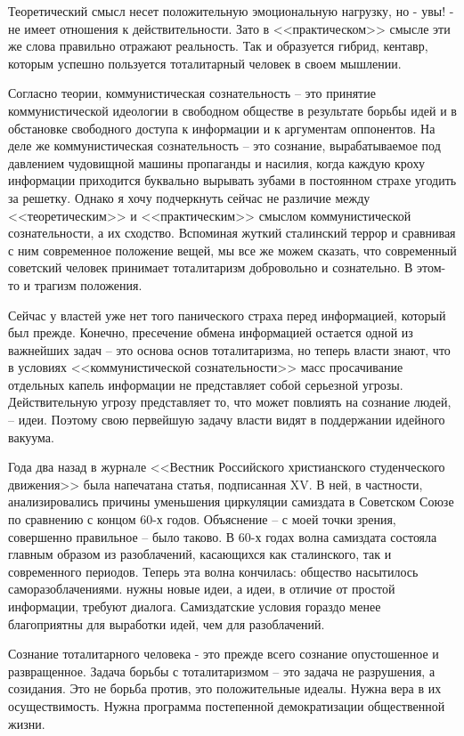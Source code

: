 \documentclass{book}
\begin{document}
Теоретиче­ский смысл несет положительную эмоциональную нагрузку, но - увы! - не имеет отношения к действительности. Зато в <<практическом>> смысле эти же слова правильно отражают реальность. Так и образуется гибрид, кентавр, которым успеш­но пользуется тоталитарный человек в своем мышлении.

Согласно теории, коммунистическая сознательность -- это принятие коммунистической идеологии в свободном обществе в результате борьбы идей и в обстановке свободного доступа к информации и к аргументам оппонентов. На деле же коммунистическая сознательность -- это сознание, вырабатываемое под давлением чудовищной машины пропаганды и насилия, когда каждую кроху информации приходится буквально вырывать зубами в постоянном страхе угодить за решетку. Однако я хочу подчеркнуть сейчас не различие между <<теоретическим>> и <<практическим>> смыслом коммунистической сознательности, а их сходство. Вспоминая жуткий сталинский террор и сравни­вая с ним современное положение вещей, мы все же можем сказать, что современный советский человек принимает тоталитаризм добровольно и сознательно. В этом-то и трагизм положения.

Сейчас у властей уже нет того панического страха перед информацией, который был прежде. Конечно, пресечение обме­на информацией остается одной из важнейших задач -- это основа основ тоталитаризма, но теперь власти знают, что в условиях <<коммунистической сознательности>> масс просачивание отдельных капель информации не представляет собой серьезной угрозы. Действительную угрозу представляет то, что может повлиять на сознание людей, -- идеи. Поэтому свою первейшую задачу власти видят в поддержании идейного вакуума.

Года два назад в журнале <<Вестник Российского христианского студенческого движения>> была напечатана статья, подписанная XV. В ней, в частности, анализировались причины уменьшения циркуляции самиздата в Советском Союзе по сравнению с концом 60-х годов. Объяснение -- с моей точки зрения, совершенно правильное -- было таково. В 60-х годах волна самиздата состояла главным образом из разоблачений,  касающихся как сталинского, так и современного периодов. Теперь эта волна кончилась: общество насытилось саморазоблачениями. нужны новые идеи, а идеи, в отличие от простой информации, требуют диалога. Самиздатские условия гораздо менее благоприятны для выработки идей, чем для разоблачений.

Сознание тоталитарного человека - это прежде всего сознание опустошенное и развращенное. Задача борьбы с тоталитаризмом -- это задача не разрушения, а созидания. Это не борьба против,  это положительные идеалы. Нужна вера в их осуществимость. Нужна программа постепенной демократизации общественной жизни.
\end{document}
